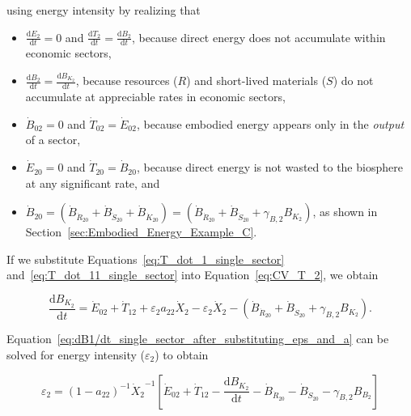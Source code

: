 \noindent{}using energy intensity by realizing that 

\begin{itemize}
	\item{$\frac{\mathrm{d}E_2}{\mathrm{d}t} = 0$
		and
		$\frac{\mathrm{d}T_2}{\mathrm{d}t} = \frac{\mathrm{d}B_2}{\mathrm{d}t}$, 
		because direct energy
		does not accumulate within economic sectors,}
	\item{$\frac{\mathrm{d}B_2}{\mathrm{d}t} = \frac{\mathrm{d}B_{K_{2}}}{\mathrm{d}t}$,
		because resources ($R$) and short-lived materials ($S$) do not 
		accumulate at appreciable rates in economic sectors,}
	\item{$\dot{B}_{02} = 0$ and $\dot{T}_{02} = \dot{E}_{02}$,
		because embodied energy appears only in the \emph{output} of a sector,}
	\item{$\dot{E}_{20} = 0$ and $\dot{T}_{20} = \dot{B}_{20}$, 
	because direct energy is not wasted to the biosphere at any significant rate, and} 
	\item{$\dot{B}_{20} = \left( \dot{B}_{\dot{R}_{20}} 
							+ \dot{B}_{\dot{S}_{20}}
							+ \dot{B}_{\dot{K}_{20}}
							\right)
						= \left( \dot{B}_{\dot{R}_{20}} 
							+ \dot{B}_{\dot{S}_{20}}
							+ \gamma_{B,2} B_{K_{2}}
							\right)$, as shown in Section~\ref{sec:Embodied_Energy_Example_C}.}
\end{itemize}

\noindent{}If we substitute Equations~\ref{eq:T_dot_1_single_sector} 
and~\ref{eq:T_dot_11_single_sector} into Equation~\ref{eq:CV_T_2}, we obtain

\begin{equation} \label{eq:dB1/dt_single_sector_after_substituting_eps_and_a}
	\frac{\mathrm{d}B_{K_{2}}}{\mathrm{d}t} 
	= \dot{E}_{02} 
	+ \dot{T}_{12}
	+ \varepsilon_{2}a_{22}\dot{X}_{2} 
	- \varepsilon_{2}\dot{X}_{2} 
	- \left( \dot{B}_{\dot{R}_{20}} 
							+ \dot{B}_{\dot{S}_{20}}
							+ \gamma_{B,2} B_{K_{2}}
							\right).
\end{equation}

Equation~\ref{eq:dB1/dt_single_sector_after_substituting_eps_and_a}
can be solved for energy intensity ($\varepsilon_{2}$) to obtain

\begin{equation} \label{eq:B-epsilon}
	\varepsilon_{2}
	= {(1 - a_{22})}^{-1} {\dot{X}_{2}}^{-1} 
		\left[
			\dot{E}_{02}
			+ \dot{T}_{12}
			- \frac{\mathrm{d}B_{K_{2}}}{\mathrm{d}t} 
			- \dot{B}_{\dot{R}_{20}}
			- \dot{B}_{\dot{S}_{20}}
			- \gamma_{B,2} B_{B_{2}}
		\right]
\end{equation}

